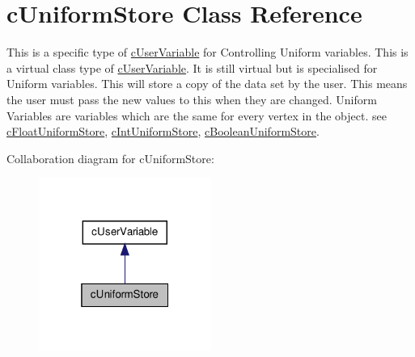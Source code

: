 \hypertarget{classc_uniform_store}{
\section{cUniformStore Class Reference}
\label{classc_uniform_store}
}


This is a specific type of \hyperlink{classc_user_variable}{cUserVariable} for Controlling Uniform variables. This is a virtual class type of \hyperlink{classc_user_variable}{cUserVariable}. It is still virtual but is specialised for Uniform variables. This will store a copy of the data set by the user. This means the user must pass the new values to this when they are changed. Uniform Variables are variables which are the same for every vertex in the object. see \hyperlink{classc_float_uniform_store}{cFloatUniformStore}, \hyperlink{classc_int_uniform_store}{cIntUniformStore}, \hyperlink{classc_boolean_uniform_store}{cBooleanUniformStore}.  




Collaboration diagram for cUniformStore:\nopagebreak
\begin{figure}[H]
\begin{center}
\leavevmode
\includegraphics[width=160pt]{classc_uniform_store__coll__graph}
\end{center}
\end{figure}
